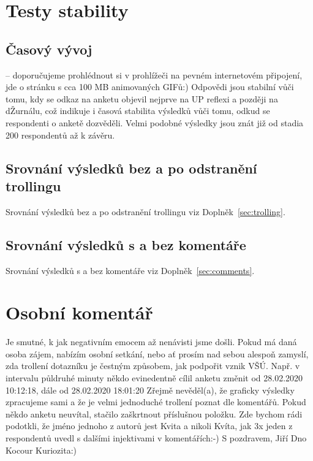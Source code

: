 \documentclass[a4paper,twoside]{article}
\begin{document}
\section{Testy stability}

\subsection{Časový vývoj}
 -- doporučujeme prohlédnout si v prohlížeči na pevném internetovém připojení, jde o stránku s cca 100 MB animovaných GIFů:) Odpovědi jsou stabilní vůči tomu, kdy se odkaz na anketu objevil nejprve na UP reflexi a později na dŽurnálu, což indikuje i časová stabilita výsledků vůči tomu, odkud se respondenti o anketě dozvěděli. Velmi podobné výsledky jsou znát již od stadia 200 respondentů až k závěru.

\subsection{Srovnání výsledků bez a po odstranění trollingu}
Srovnání výsledků bez a po odstranění trollingu viz Doplněk~\ref{sec:trolling}.

\subsection{Srovnání výsledků s a bez komentáře}
Srovnání výsledků s a bez komentáře viz Doplněk~\ref{sec:comments}.

\section{Osobní komentář}
Je smutné, k jak negativním emocem až nenávisti jsme došli.
Pokud má daná osoba zájem, nabízím osobní setkání, nebo ať prosím nad sebou alespoň zamyslí, zda trollení dotazníku je čestným způsobem, jak podpořit vznik VŠÚ. Např. v intervalu půldruhé minuty někdo evinedentně cílil anketu změnit od 28.02.2020 10:12:18, dále od 28.02.2020 18:01:20
Zřejmě nevěděl(a), že graficky výsledky zpracujeme sami a že je velmi jednoduché trollení poznat dle komentářů.
Pokud někdo anketu neuvítal, stačilo zaškrtnout příslušnou položku. Zde bychom rádi podotkli, že jméno jednoho z autorů jest Kvita a nikoli Kvíta, jak 3x jeden z respondentů uvedl s dalšími injektivami v komentářích:-) S pozdravem, Jiří Dno Kocour Kuriozita:)
\end{document}
